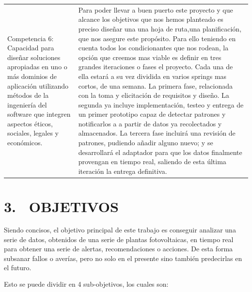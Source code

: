 \documentclass[a4paper]{article}
\begin{document}
\begin{center}
\begin{supertabular}{m{5.605cm}m{10.849cm}}
    {\color{black} Competencia 6: Capacidad para dise\~nar soluciones apropiadas en uno o m\'as dominios de aplicaci\'on utilizando m\'etodos de la ingenier\'ia del software que integren aspectos \'eticos, sociales, legales y econ\'omicos.} &
    {\color{black} Para poder llevar a buen puerto este proyecto y que alcance los objetivos que nos hemos planteado es preciso diseñar una una hoja de ruta,una planificación, que nos asegure este propósito. Para ello teniendo en cuenta todos los condicionantes que nos rodean, la opción que creemos mas viable es definir en tres grandes iteraciones o fases el proyecto. Cada una de ella estará a su vez dividida en varios springs mas cortos, de una semana. La primera fase, relacionada con la toma y elicitación de requisitos y diseño. La segunda ya incluye implementación, testeo y entrega de un primer prototipo capaz de detectar patrones y notificarlos a a partir de datos ya recolectados y almacenados. La tercera fase incluirá una revisión de patrones, pudiendo añadir alguno nuevo; y se desarrollará el adaptador para que los datos finalmente provengan en tiempo real, saliendo de esta última iteración la entrega definitiva.
    }\\

\end{supertabular}
\end{center}
\bigskip

\section{3. \ OBJETIVOS}
Siendo concisos, el objetivo principal de este trabajo es conseguir analizar una serie de datos, obtenidos de una serie de plantas fotovoltaicas, en tiempo real para obtener una serie de alertas, recomendaciones o acciones. De esta forma subsanar fallos o averías, pero no solo en el presente sino también predecirlas en el futuro.

Esto se puede dividir en 4 sub-objetivos, los cuales son:
\end{document}
